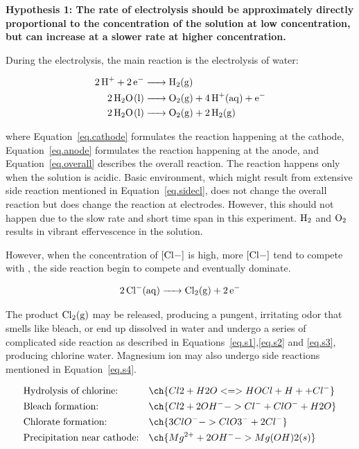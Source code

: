 \documentclass[a4paper]{article}
\begin{document}
\textbf{Hypothesis 1: The rate of electrolysis should be approximately directly proportional to the concentration of the solution at low concentration, but can increase at a slower rate at higher concentration.}

During the electrolysis, the main reaction is the electrolysis of water:

\begin{align}
    \ce{2 H+ + 2 e- &-> H2(g)}  \label{eq.cathode}\\ 
    \ce{2 H2O(l) &-> O2(g) + 4H+(aq) + e-}   \label{eq.anode}\\ 
    \ce{2 H2O(l) &-> O2(g) + 2 H2(g)}  \label{eq.overall}
\end{align}

where Equation~\ref{eq.cathode} formulates the reaction happening at the cathode, Equation~\ref{eq.anode} formulates the reaction happening at the anode, and Equation~\ref{eq.overall} describes the overall reaction. The reaction happens only when the solution is acidic. Basic environment, which might result from extensive side reaction mentioned in Equation~\ref{eq.sidecl}, does not change the overall reaction but does change the reaction at electrodes. However, this should not happen due to the slow rate and short time span in this experiment. $\ce{H2}$ and $\ce{O2}$ results in vibrant effervescence in the solution.

However, when the concentration of $\ce{[Cl-]}$ is high, more $\ce{[Cl-]}$ tend to compete with , the side reaction begin to compete and eventually dominate.

\begin{equation}
    \ce{2Cl-(aq) -> Cl2(g) + 2e-} \label{eq.sidecl}
\end{equation}

The product $\ce{Cl2(g)}$ may be released, producing a pungent, irritating odor that smells like bleach, or end up dissolved in water and undergo a series of complicated side reaction as described in Equations~\ref{eq.s1},\ref{eq.s2} and \ref{eq.s3}, producing chlorine water. Magnesium ion may also undergo side reactions mentioned in Equation~\ref{eq.s4}.

\begin{align}
  &\text{Hydrolysis of chlorine:} && \ch{Cl2 + H2O <=> HOCl + H+ + Cl^-} \label{eq.s1}\\
  &\text{Bleach formation:} && \ch{Cl2 + 2OH^- -> Cl^- + ClO^- + H2O} \label{eq.s2}\\
  &\text{Chlorate formation:} && \ch{3 ClO^- -> ClO3^- + 2 Cl^-} \label{eq.s3}\\
  &\text{Precipitation near cathode:} && \ch{Mg^{2+} + 2 OH^- -> Mg(OH)2(s)}\label{eq.s4}
\end{align}
\end{document}
